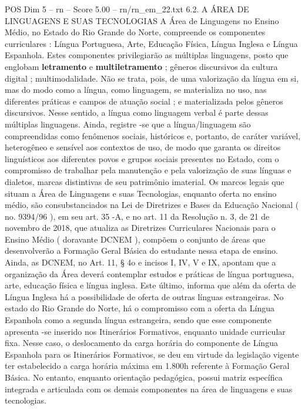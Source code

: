\begin{textsample}{POS Dim 5 – rn – Score 5.00 – rn/rn\_em\_22.txt}  \label{ex:f5_pos_146}
6.2.
A ÁREA DE LINGUAGENS E SUAS TECNOLOGIAS A Área de Linguagens no Ensino Médio, no Estado do Rio Grande do Norte, compreende os componentes curriculares : Língua Portuguesa, Arte, Educação Física, Língua Inglesa e Língua Espanhola.
Estes componentes privilegiarão as múltiplas linguagens, posto que englobam \textbf{letramento} e \textbf{multiletramento} ; gêneros discursivos da cultura digital ; multimodalidade.
Não se trata, pois, de uma valorização da língua em si, mas do modo como a língua, como linguagem, se materializa no uso, nas diferentes práticas e campos de atuação social ; e materializada pelos gêneros discursivos.
Nesse sentido, a língua como linguagem verbal é parte dessas múltiplas linguagens.
Ainda, registre -se que a língua/linguagem são compreendidas como fenômenos sociais, históricos e, portanto, de caráter variável, heterogêneo e sensível aos contextos de uso, de modo que garanta os direitos linguísticos aos diferentes povos e grupos sociais presentes no Estado, com o compromisso de trabalhar pela manutenção e pela valorização de suas línguas e dialetos, marcas distintivas de seu patrimônio imaterial.
Os marcos legais que situam a Área de Linguagens e suas Tecnologias, enquanto oferta no ensino médio, são consubstanciados na Lei de Diretrizes e Bases da Educação Nacional ( no. 9394/96 ), em seu art. 35 -A, e no art. 11 da Resolução n. 3, de 21 de novembro de 2018, que atualiza as Diretrizes Curriculares Nacionais para o Ensino Médio ( doravante DCNEM ), compõem o conjunto de áreas que desenvolverão a Formação Geral Básica do estudante nessa etapa de ensino.
Ainda, as DCNEM, no Art. 11, § 4o e incisos I, IV, V e IX, apontam que a organização da Área deverá contemplar estudos e práticas de língua portuguesa, arte, educação física e língua inglesa.
Este último, informa que além da oferta de Língua Inglesa há a possibilidade de oferta de outras línguas estrangeiras.
No estado do Rio Grande do Norte, há o compromisso com a oferta da Língua Espanhola como a segunda língua estrangeira, sendo que esse componente apresenta -se inserido nos Itinerários Formativos, enquanto unidade curricular fixa.
Nesse caso, o deslocamento da carga horária do componente de Língua Espanhola para os Itinerários Formativos, se deu em virtude da legislação vigente ter estabelecido a carga horária máxima em 1.800h referente à Formação Geral Básica.
No entanto, enquanto orientação pedagógica, possui matriz específica integrada e articulada com os demais componentes na área de linguagens e suas tecnologias.

\end{textsample}
